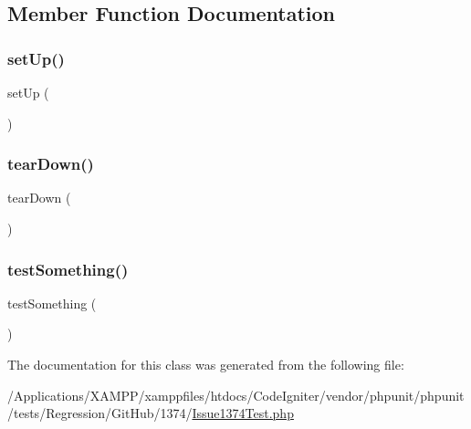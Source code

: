 \subsection{Member Function Documentation}
\mbox{\label{class_issue1374_test_a0bc688732d2b3b162ffebaf7812e78da}} 
\subsubsection{\texorpdfstring{set\+Up()}{setUp()}}
{\footnotesize\ttfamily set\+Up (\begin{DoxyParamCaption}{ }\end{DoxyParamCaption})\hspace{0.3cm}{\ttfamily [protected]}}

\mbox{\label{class_issue1374_test_a80fe3d17e658907fc75346a0ec9d6fc7}} 
\subsubsection{\texorpdfstring{tear\+Down()}{tearDown()}}
{\footnotesize\ttfamily tear\+Down (\begin{DoxyParamCaption}{ }\end{DoxyParamCaption})\hspace{0.3cm}{\ttfamily [protected]}}

\mbox{\label{class_issue1374_test_a0fc4e17369bc9607ebdd850d9eda8167}} 
\subsubsection{\texorpdfstring{test\+Something()}{testSomething()}}
{\footnotesize\ttfamily test\+Something (\begin{DoxyParamCaption}{ }\end{DoxyParamCaption})}



The documentation for this class was generated from the following file\+:\begin{DoxyCompactItemize}
\item 
/\+Applications/\+X\+A\+M\+P\+P/xamppfiles/htdocs/\+Code\+Igniter/vendor/phpunit/phpunit/tests/\+Regression/\+Git\+Hub/1374/\mbox{\hyperlink{_issue1374_test_8php}{Issue1374\+Test.\+php}}\end{DoxyCompactItemize}
